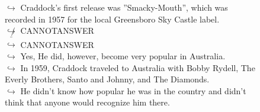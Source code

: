 \documentclass[11pt,a4paper, onecolumn]{article}
\begin{document}
\begin{figure}[t] \small \begin{tcolorbox}[boxsep=0pt,left=5pt,right=0pt,top=2pt,colback = yellow!5] \begin{dialogue}
 \small 
\colorbox{pink!25}{$\hookrightarrow$}
{ Craddock's first release was ''Smacky-Mouth'', which was recorded in 1957 for the local Greensboro Sky Castle label. }
\\
\colorbox{pink!25}{$\not\hookrightarrow$}
{ CANNOTANSWER }
\\
\colorbox{pink!25}{ $\bar{\hookrightarrow}$}
{ CANNOTANSWER }
\\
\colorbox{pink!25}{$\hookrightarrow$}
\colorbox{red!25}{Yes,}
{ He did, however, become very popular in Australia. }
\\
\colorbox{pink!25}{$\hookrightarrow$}
{ In 1959, Craddock traveled to Australia with Bobby Rydell, The Everly Brothers, Santo and Johnny, and The Diamonds. }
\\
\colorbox{pink!25}{$\hookrightarrow$}
{ He didn't know how popular he was in the country and didn't think that anyone would recognize him there. }
\\
 \end{dialogue}\end{tcolorbox}\end{figure}
\end{document}
